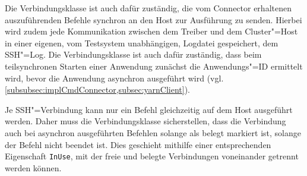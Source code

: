 Die Verbindungsklasse ist auch dafür zuständig, die vom Connector erhaltenen auszuführenden Befehle synchron an den Host zur Ausführung zu senden.
Hierbei wird zudem jede Kommunikation zwischen dem Treiber und dem Cluster"=Host in einer eigenen, vom Testsystem unabhängigen, Logdatei gespeichert, dem SSH"=Log.
Die Verbindungsklasse ist auch dafür zuständig, dass beim teilsynchronen Starten einer Anwendung zunächst die Anwendungs"=ID ermittelt wird, bevor die Anwendung asynchron ausgeführt wird (vgl. \cref{subsubsec:implCmdConnector,subsec:yarnClient}).

Je SSH"=Verbindung kann nur ein Befehl gleichzeitig auf dem Host ausgeführt werden.
Daher muss die Verbindungsklasse sicherstellen, dass die Verbindung auch bei asynchron ausgeführten Befehlen solange als belegt markiert ist, solange der Befehl nicht beendet ist.
Dies geschieht mithilfe einer entsprechenden Eigenschaft \texttt{InUse}, mit der freie und belegte Verbindungen voneinander getrennt werden können.
